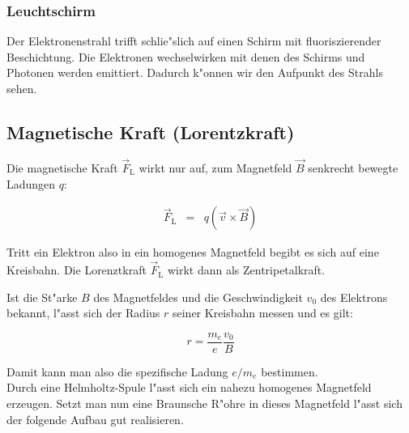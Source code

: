 		\subsubsection{Leuchtschirm}

			Der Elektronenstrahl trifft schlie"slich auf einen Schirm mit fluoriszierender Beschichtung.
			Die Elektronen wechselwirken mit denen des Schirms und Photonen werden emittiert. Dadurch k"onnen wir den Aufpunkt des Strahls sehen.

	\subsection{Magnetische Kraft (Lorentzkraft)}

		Die magnetische Kraft $\vec{F}_\mathrm{L}$ wirkt nur auf, zum Magnetfeld $\vec{B}$ senkrecht bewegte La\-dun\-gen $q$:

		\begin{eqnarray}
			\vec{F}_\mathrm{L} & = & q \left( \vec{v} \times \vec{B} \right)
		\end{eqnarray}

		Tritt ein Elektron also in ein homogenes Magnetfeld begibt es sich auf eine Kreisbahn.
		Die Lorenztkraft $\vec{F}_\mathrm{L}$ wirkt dann als Zentripetalkraft.

		\newpage
		
		Ist die St"arke $B$ des Magnetfeldes und die Geschwindigkeit $v_0$ des Elektrons bekannt, l"asst sich der Radius $r$ seiner Kreisbahn messen und es gilt:

		\begin{equation}
			r = \frac{m_e}{e} \frac{v_0}{B}
		\end{equation}
	
		Damit kann man also die spezifische Ladung $e / m_e$ bestimmen.\\

		Durch eine Helmholtz-Spule l"asst sich ein nahezu homogenes Magnetfeld erzeugen.
		Setzt man nun eine Braunsche R"ohre in dieses Magnetfeld l"asst sich der folgende Aufbau gut realisieren.

